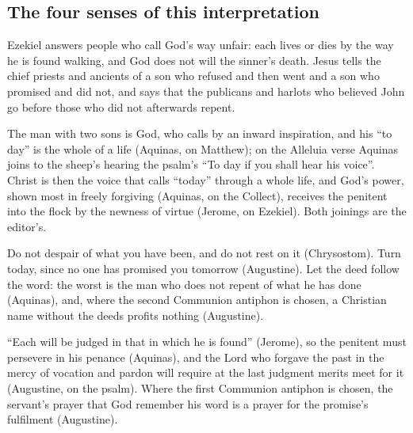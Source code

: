 \subsection{The four senses of this interpretation}

\begin{fourSenses}
\item[Literal.] Ezekiel answers people who call God's way unfair: each lives or
dies by the way he is found walking, and God does not will the sinner's death.
Jesus tells the chief priests and ancients of a son who refused and then went
and a son who promised and did not, and says that the publicans and harlots who
believed John go before those who did not afterwards repent.

\item[Allegorical.] The man with two sons is God, who calls by an inward
inspiration, and his ``to day'' is the whole of a life (Aquinas, on Matthew);
on the Alleluia verse Aquinas joins to the sheep's hearing the psalm's ``To day
if you shall hear his voice''. Christ is then the voice that calls ``today''
through a whole life, and God's power, shown most in freely forgiving
(Aquinas, on the Collect), receives the penitent into the flock by the newness
of virtue (Jerome, on Ezekiel). Both joinings are the editor's.

\item[Moral.] Do not despair of what you have been, and do not rest on it
(Chrysostom). Turn today, since no one has promised you tomorrow (Augustine).
Let the deed follow the word: the worst is the man who does not repent of what
he has done (Aquinas), and, where the second Communion antiphon is chosen, a
Christian name without the deeds profits nothing (Augustine).

\item[Anagogical.] ``Each will be judged in that in which he is found''
(Jerome), so the penitent must persevere in his penance (Aquinas), and the
Lord who forgave the past in the mercy of vocation and pardon will require at
the last judgment merits meet for it (Augustine, on the psalm). Where the first
Communion antiphon is chosen, the servant's prayer that God remember his word
is a prayer for the promise's fulfilment (Augustine).
\end{fourSenses}
